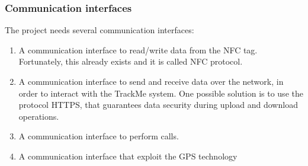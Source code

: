 \subsubsection{Communication interfaces} 
The project needs several communication interfaces:
\begin{enumerate}
\item A communication interface to read/write data from the NFC tag. Fortunately, this already exists and it is called NFC protocol.
\item A communication interface to send and receive data over the network, in order to interact with the TrackMe system. One possible solution is to use the protocol HTTPS, that guarantees data security during upload and download operations. 
\item A communication interface to perform calls. 
\item A communication interface that exploit the GPS technology
\end{enumerate} 
